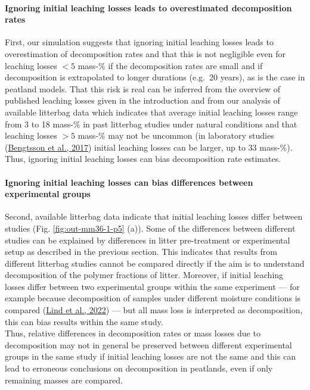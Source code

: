 \documentclass[
  12pt,
]{article}
\begin{document}
\hypertarget{ignoring-initial-leaching-losses-leads-to-overestimated-decomposition-rates}{%
\paragraph*{Ignoring initial leaching losses leads to overestimated decomposition rates}\label{ignoring-initial-leaching-losses-leads-to-overestimated-decomposition-rates}}

First, our simulation suggests that ignoring initial leaching losses leads to overestimation of decomposition rates and that this is not negligible even for leaching losses \(<5\) mass-\% if the decomposition rates are small and if decomposition is extrapolated to longer durations (e.g.~20 years), as is the case in peatland models. That this risk is real can be inferred from the overview of published leaching losses given in the introduction and from our analysis of available litterbag data which indicates that average initial leaching losses range from 3 to 18 mass-\% in past litterbag studies under natural conditions and that leaching losses \(>5\) mass-\% may not be uncommon (in laboratory studies (\protect\hyperlink{ref-Bengtsson.2017}{Bengtsson et al., 2017}) initial leaching losses can be larger, up to 33 mass-\%). Thus, ignoring initial leaching losses can bias decomposition rate estimates.

\hypertarget{ignoring-initial-leaching-losses-can-bias-differences-between-experimental-groups}{%
\paragraph*{Ignoring initial leaching losses can bias differences between experimental groups}\label{ignoring-initial-leaching-losses-can-bias-differences-between-experimental-groups}}

Second, available litterbag data indicate that initial leaching losses differ between studies (Fig. \ref{fig:out-mm36-1-p5} (a)). Some of the differences between different studies can be explained by differences in litter pre-treatment or experimental setup as described in the previous section. This indicates that results from different litterbag studies cannot be compared directly if the aim is to understand decomposition of the polymer fractions of litter. Moreover, if initial leaching losses differ between two experimental groups within the same experiment --- for example because decomposition of samples under different moisture conditions is compared (\protect\hyperlink{ref-Lind.2022}{Lind et al., 2022}) --- but all mass loss is interpreted as decomposition, this can bias results within the same study.\\
Thus, relative differences in decomposition rates or mass losses due to decomposition may not in general be preserved between different experimental groups in the same study if initial leaching losses are not the same and this can lead to erroneous conclusions on decomposition in peatlands, even if only remaining masses are compared.
\end{document}
